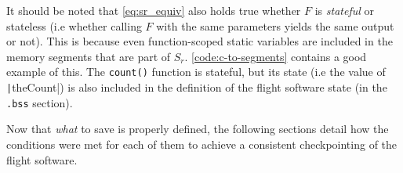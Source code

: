 {It should be noted that \autoref{eq:sr_equiv} also holds true whether $F$ is \textit{stateful} or stateless (i.e whether calling $F$ with the same parameters yields the same output or not). This is because even function-scoped static variables are included in the memory segments that are part of $S_r$. \autoref{code:c-to-segments} contains a good example of this. The \texttt{count()} function is stateful, but its state (i.e the value of \texttt|theCount|) is also included in the definition of the flight software state (in the \texttt{.bss} section).

Now that \textit{what} to save is properly defined, the following sections detail how the conditions were met for each of them to achieve a consistent checkpointing of the flight software.

%


}